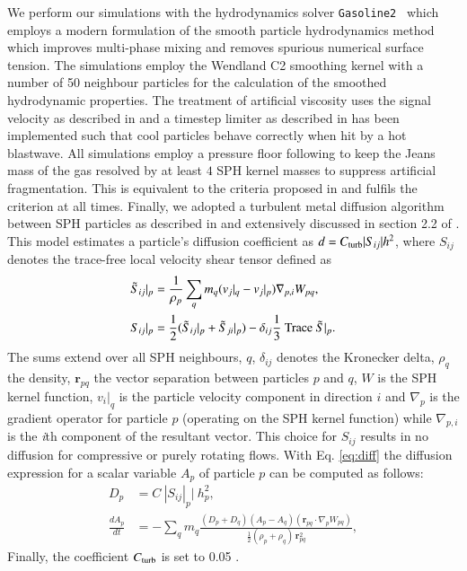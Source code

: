 \documentclass{aa}
\newcommand{\vect}[1]{\boldsymbol{#1}}
\newcommand{\G}{\texttt{Gasoline2}}
\begin{document}
We perform our simulations with the hydrodynamics solver \G\ \citep{Wadsley2017} which employs a modern formulation of the smooth particle hydrodynamics method which improves multi-phase mixing and removes spurious numerical surface tension. The simulations employ the Wendland C2 smoothing kernel \citep{Dehnen2012} with a number of 50 neighbour particles for the calculation of the smoothed hydrodynamic properties. The treatment of artificial viscosity uses the signal velocity as described in \cite{Price2008} and a timestep limiter as  described in \cite{Saitoh2009} has been implemented such that cool particles behave correctly when hit by a hot blastwave. All simulations employ a pressure floor following \citet{Agertz2009} to keep the Jeans mass of the gas resolved by at least $4$ SPH kernel masses to suppress artificial fragmentation. This is equivalent to the criteria proposed in \citet{Richings2016} and fulfils the \citet{Truelove1997} criterion at all times. Finally, we adopted a turbulent metal diffusion algorithm between SPH particles as described in \cite{Wadsley2008} and extensively discussed in section 2.2  of \citet{Shen2010}.  
This model estimates a particle's diffusion coefficient as $d = C_{\rm turb}\vert S_{ij}\vert h^2$, where $S_{ij}$ denotes the trace-free local velocity shear tensor defined as 
\begin{align}
\tilde{S}_{ij}|_p &= \frac{1}{\rho_p}\sum_q m_q (v_j|_q-v_j|_p)
\nabla_{p,i} W_{pq}, \nonumber \\ 
S_{ij}|_p &= \frac{1}{2}(\tilde{S}_{ij}|_p+\tilde{S}_{ji}|_p) - \delta_{ij} \frac{1}{3}\ {\rm Trace}\ \tilde{S}|_p.
\label{eq:diff}
\end{align}
The sums extend over all SPH neighbours, $q$, $\delta_{ij}$ denotes the Kronecker delta, $\rho_q$ the density, $\mathbf{r}_{pq}$ the vector separation between particles $p$ and $q$, $W$ is the SPH kernel function, $v_i|_q$ is the particle velocity component in direction $i$ and $\nabla_p$ is the gradient operator for particle $p$ (operating on the SPH kernel function) while $\nabla_{p,i}$ is the {\it i}th component of the resultant vector. This choice for $S_{ij}$ results in no diffusion for compressive or purely rotating flows. 
With Eq. \ref{eq:diff} the diffusion expression for a scalar variable $A_p$ of particle $p$ can be computed as follows:
\begin{align}
D_p &= C\ |S_{ij}|_p|\ h_p^2,\nonumber \\
\frac{dA_p}{dt} &= -\sum_q m_q \frac{(D_p+D_q)(A_p-A_q)(\vect{r}_{pq}\cdot\nabla_p W_{pq})}{\frac{1}{2}(\rho_p+\rho_q)\,\vect{r}_{pq}^2},
\end{align}
Finally, the coefficient $C_{\rm turb}$ is set to 0.05 \citep{Wadsley2008,Shen2010}.
\end{document}
